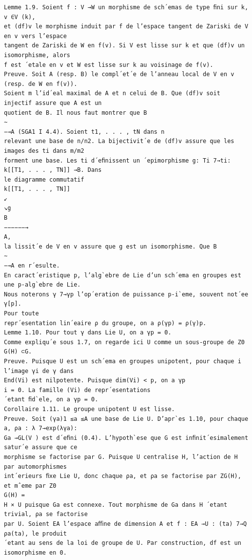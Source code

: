 \documentclass[10pt]{article}
\begin{document}
\begin{verbatim}
Lemme 1.9. Soient f : V →W un morphisme de sch´emas de type ﬁni sur k, v ∈V (k),
et (df)v le morphisme induit par f de l’espace tangent de Zariski de V en v vers l’espace
tangent de Zariski de W en f(v). Si V est lisse sur k et que (df)v un isomorphisme, alors
f est ´etale en v et W est lisse sur k au voisinage de f(v).
Preuve. Soit A (resp. B) le compl´et´e de l’anneau local de V en v (resp. de W en f(v)).
Soient m l’id´eal maximal de A et n celui de B. Que (df)v soit injectif assure que A est un
quotient de B. Il nous faut montrer que B
∼
−→A (SGA1 I 4.4). Soient t1, . . . , tN dans n
relevant une base de n/n2. La bijectivit´e de (df)v assure que les images des ti dans m/m2
forment une base. Les ti d´eﬁnissent un ´epimorphisme g: Ti 7→ti: k[[T1, . . . , TN]] →B. Dans
le diagramme commutatif
k[[T1, . . . , TN]]
↙
↘g
B
−−−−−−→
A,
la lissit´e de V en v assure que g est un isomorphisme. Que B
∼
−→A en r´esulte.
En caract´eristique p, l’alg`ebre de Lie d’un sch´ema en groupes est une p-alg`ebre de Lie.
Nous noterons γ 7→γp l’op´eration de puissance p-i`eme, souvent not´ee γ[p].
Pour toute
repr´esentation lin´eaire ρ du groupe, on a ρ(γp) = ρ(γ)p.
Lemme 1.10. Pour tout γ dans Lie U, on a γp = 0.
Comme expliqu´e sous 1.7, on regarde ici U comme un sous-groupe de Z0
G(H) ⊂G.
Preuve. Puisque U est un sch´ema en groupes unipotent, pour chaque i l’image γi de γ dans
End(Vi) est nilpotente. Puisque dim(Vi) < p, on a γp
i = 0. La famille (Vi) de repr´esentations
´etant ﬁd`ele, on a γp = 0.
Corollaire 1.11. Le groupe unipotent U est lisse.
Preuve. Soit (γa)1 ≤a ≤A une base de Lie U. D’apr`es 1.10, pour chaque a, ρa : λ 7→exp(λγa):
Ga →GL(V ) est d´eﬁni (0.4). L’hypoth`ese que G est inﬁnit´esimalement satur´e assure que ce
morphisme se factorise par G. Puisque U centralise H, l’action de H par automorphismes
int´erieurs ﬁxe Lie U, donc chaque ρa, et ρa se factorise par ZG(H), et mˆeme par Z0
G(H) =
H × U puisque Ga est connexe. Tout morphisme de Ga dans H ´etant trivial, ρa se factorise
par U. Soient EA l’espace aﬃne de dimension A et f : EA →U : (ta) 7→Q ρa(ta), le produit
´etant au sens de la loi de groupe de U. Par construction, df est un isomorphisme en 0.


\end{verbatim}
\end{document}
